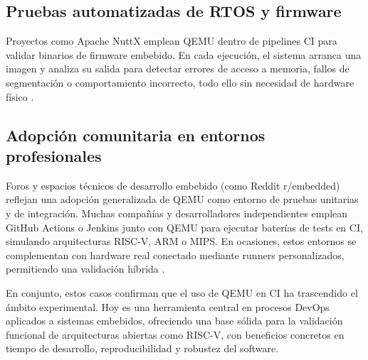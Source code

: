 \subsection*{Pruebas automatizadas de RTOS y firmware}

Proyectos como Apache NuttX emplean QEMU dentro de pipelines CI para validar binarios de firmware embebido. En cada ejecución, el sistema arranca una imagen y analiza su salida para detectar errores de acceso a memoria, fallos de segmentación o comportamiento incorrecto, todo ello sin necesidad de hardware físico \cite{apache_nuttx}.

\subsection*{Adopción comunitaria en entornos profesionales}

Foros y espacios técnicos de desarrollo embebido (como Reddit r/embedded) reflejan una adopción generalizada de QEMU como entorno de pruebas unitarias y de integración. Muchas compañías y desarrolladores independientes emplean GitHub Actions o Jenkins junto con QEMU para ejecutar baterías de tests en CI, simulando arquitecturas RISC-V, ARM o MIPS. En ocasiones, estos entornos se complementan con hardware real conectado mediante runners personalizados, permitiendo una validación híbrida \cite{reddit_ci}.

\vspace{1em}
En conjunto, estos casos confirman que el uso de QEMU en CI ha trascendido el ámbito experimental. Hoy es una herramienta central en procesos DevOps aplicados a sistemas embebidos, ofreciendo una base sólida para la validación funcional de arquitecturas abiertas como RISC-V, con beneficios concretos en tiempo de desarrollo, reproducibilidad y robustez del software.






